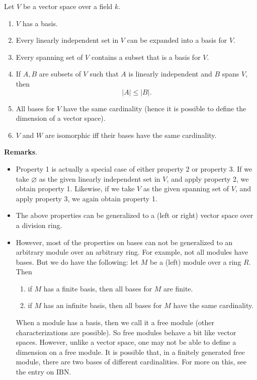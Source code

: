 \documentclass[12pt]{article}
\begin{document}
Let $V$ be a vector space over a field $k$.

\begin{enumerate}
\item $V$ has a basis.
\item Every linearly independent set in $V$ can be expanded into a basis for $V$.
\item Every spanning set of $V$ contains a subset that is a basis for $V$.
\item If $A,B$ are subsets of $V$ such that $A$ is linearly independent and $B$ spans $V$, then $$|A|\le |B|.$$
\item All bases for $V$ have the same cardinality (hence it is possible to define the dimension of a vector space).
\item $V$ and $W$ are isomorphic iff their bases have the same cardinality.
\end{enumerate}

\textbf{Remarks}.  
\begin{itemize}
\item
Property 1 is actually a special case of either property 2 or property 3.  If we take $\varnothing$ as the given linearly independent set in $V$, and apply property 2, we obtain property 1.  Likewise, if we take $V$ as the given spanning set  of $V$, and apply property 3, we again obtain property 1.
\item
The above properties can be generalized to a (left or right) vector space over a division ring.
\item
However, most of the properties on bases can not be generalized to an arbitrary module over an arbitrary ring.   For example, not all modules have bases.  But we do have the following: let $M$ be a (left) module over a ring $R$.  Then
\begin{enumerate}
\item if $M$ has a finite basis, then all bases for $M$ are finite.
\item if $M$ has an infinite basis, then all bases for $M$ have the same cardinality.
\end{enumerate}
When a module has a basis, then we call it a free module (other characterizations are possible).  So free modules behave a bit like vector spaces.  However, unlike a vector space, one may not be able to define a dimension on a free module.  It is possible that, in a finitely generated free module, there are two bases of different cardinalities.  For more on this, see the entry on IBN.
\end{itemize}
\end{document}
